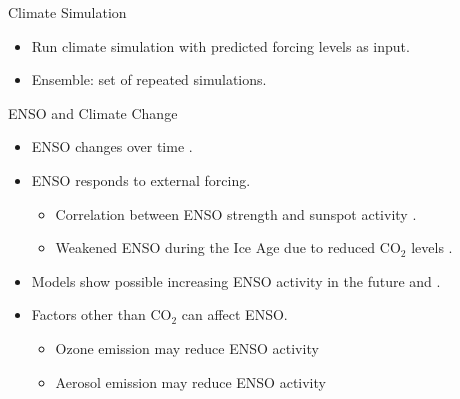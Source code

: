 \documentclass{beamer}
\begin{document}
\begin{frame}{Climate Simulation}
  \begin{itemize}
  \item Run climate simulation with predicted forcing levels as input.
  \item \alert{Ensemble:} set of repeated simulations.
  \end{itemize}
\end{frame}

\begin{frame}{ENSO and Climate Change}
  \begin{itemize}
  \item ENSO changes over time \citep{lubbecke2014assessing}.
  \item ENSO responds to external forcing.
    \begin{itemize}
    \item Correlation between ENSO strength and sunspot activity \citep{emile2007nino}.
    \item Weakened ENSO during the Ice Age due to reduced CO$_2$ levels \citep{zhu2017reduced}.
    \end{itemize}
  \item Models show possible increasing ENSO activity in the future \citep{zheng2017response} and \citep{maher2018enso}.
  \item Factors other than CO$_2$ can affect ENSO.
    \begin{itemize}
    \item Ozone emission may reduce ENSO activity \citep{nowack2017role}
    \item Aerosol emission may reduce ENSO activity \citep{stevenson2017forced}
    \end{itemize}
  \end{itemize}
\end{frame}
\end{document}
